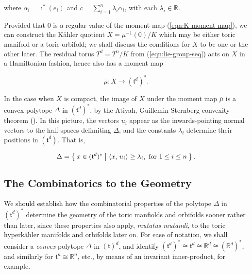 \documentclass{amsart}
\newcommand{\lra}{\longrightarrow}
\newcommand{\RR}{\mathbb{R}}
\newcommand{\mft}{\mathfrak{t}}
\newcommand{\mubar}{\overline{\mu}}
\begin{document}
    where $\alpha_{i} = \imath^{\ast}(e_{i})$ and $c = \sum_{i=1}^{n} \lambda_{i}\alpha_{i}$, with each $\lambda_{i} \in \RR$.
    
    Provided that $0$ is a regular value of the moment map (\ref{eqn:K-moment-map}), we can construct the K\"ahler quotient $X = \mu^{-1}(0)/K$ which may be either toric manifold or a toric orbifold; we shall discuss the conditions for $X$ to be one or the other later. The residual torus $T^{d} = T^{n}/K$ from (\ref{eqn:lie-group-seq}) acts on $X$ in a Hamiltonian fashion, hence also has a moment map
    
    \begin{equation}\label{eqn:Td-moment-map}
        \mubar : X \lra (\mft^{d})^{\ast}.
    \end{equation}

    In the case when $X$ is compact, the image of $X$ under the moment map $\mubar$ is a convex polytope $\Delta$ in $(\mft^{d})^{\ast}$, by the Atiyah, Guillemin-Sternberg convexity theorem (\cite{Ati82, GS82}). In this picture, the vectors $u_{i}$ appear as the inwards-pointing normal vectors to the half-spaces delimiting $\Delta$, and the constants $\lambda_{i}$ determine their positions in $(\mft^{d})$. That is,
    
    \begin{equation}\label{eqn:polytope-half-spaces}
        \Delta = \Set{x \in (\mft^{d})^{\ast} | \langle x,\, u_{i} \rangle \geq \lambda_{i}, \text{ for } 1 \leq i \leq n}.
    \end{equation}
    
    \subsection{The Combinatorics to the Geometry}
   
   We should establish how the combinatorial properties of the polytope $\Delta$ in $(\mft^{d})^{\ast}$ determine the geometry of the toric manfiolds and orbifolds sooner rather than later, since these properties also apply, \emph{mutatus mutandi}, to the toric hyperk\"ahler manifolds and orbifolds later on. For ease of notation, we shall consider a \emph{convex} polytope $\Delta$ in $(\mft)^{d}$, and identify $(\mft^{d})^{\ast} \cong \mft^{d} \cong \RR^{d} \cong (\RR^{d})^{\ast}$, and similarly for $\mft^{n} \cong \RR^{n}$, etc., by means of an invariant inner-product, for example. 
   
\end{document}
